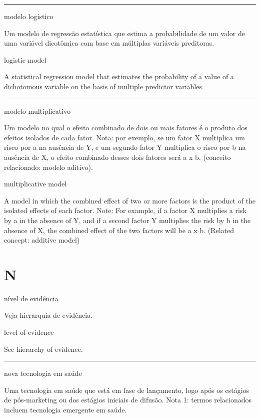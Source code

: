 \documentclass[
  openany]{book}
\begin{document}
\begin{center}\rule{0.5\linewidth}{0.5pt}\end{center}

modelo logístico

Um modelo de regressão estatística que estima a probabilidade de um valor de uma variável dicotômica com base em múltiplas variáveis preditoras.

logistic model

A statistical regression model that estimates the probability of a value of a dichotomous variable on the basis of multiple predictor variables.

\begin{center}\rule{0.5\linewidth}{0.5pt}\end{center}

modelo multiplicativo

Um modelo no qual o efeito combinado de dois ou mais fatores é o produto dos efeitos isolados de cada fator. Nota: por exemplo, se um fator X multiplica um risco por a na ausência de Y, e um segundo fator Y multiplica o risco por b na ausência de X, o efeito combinado desses dois fatores será a x b. (conceito relacionado: modelo aditivo).

multiplicative model

A model in which the combined effect of two or more factors is the product of the isolated effects of each factor. Note: For example, if a factor X multiplies a risk by a in the absence of Y, and if a second factor Y multiplies the risk by b in the absence of X, the combined effect of the two factors will be a x b. (Related concept: additive model)

\hypertarget{n}{%
\chapter*{N}\label{n}}

nível de evidência

Veja hierarquia de evidência.

level of evidence

See hierarchy of evidence.

\begin{center}\rule{0.5\linewidth}{0.5pt}\end{center}

nova tecnologia em saúde

Uma tecnologia em saúde que está em fase de lançamento, logo após os estágios de pós-marketing ou dos estágios iniciais de difusão. Nota 1: termos relacionados incluem tecnologia emergente em saúde.
\end{document}

